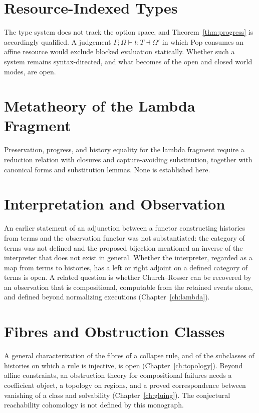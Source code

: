 \documentclass[12pt,oneside,openany]{book}
\theoremstyle{spherepop}
\theoremstyle{remarkstyle}
\begin{document}
\section{Resource-Indexed Types}

The type system does not track the option space, and Theorem~\ref{thm:progress} is accordingly qualified. A judgement $\Gamma;\Omega\vdash t:T\dashv\Omega'$ in which Pop consumes an affine resource would exclude blocked evaluation statically. Whether such a system remains syntax-directed, and what becomes of the open and closed world modes, are open.

\section{Metatheory of the Lambda Fragment}

Preservation, progress, and history equality for the lambda fragment require a reduction relation with closures and capture-avoiding substitution, together with canonical forms and substitution lemmas. None is established here.

\section{Interpretation and Observation}

An earlier statement of an adjunction between a functor constructing histories from terms and the observation functor was not substantiated: the category of terms was not defined and the proposed bijection mentioned an inverse of the interpreter that does not exist in general. Whether the interpreter, regarded as a map from terms to histories, has a left or right adjoint on a defined category of terms is open. A related question is whether Church--Rosser can be recovered by an observation that is compositional, computable from the retained events alone, and defined beyond normalizing executions (Chapter~\ref{ch:lambda}).

\section{Fibres and Obstruction Classes}

A general characterization of the fibres of a collapse rule, and of the subclasses of histories on which a rule is injective, is open (Chapter~\ref{ch:topology}). Beyond affine constraints, an obstruction theory for compositional failures needs a coefficient object, a topology on regions, and a proved correspondence between vanishing of a class and solvability (Chapter~\ref{ch:gluing}). The conjectural reachability cohomology is not defined by this monograph.
\end{document}
